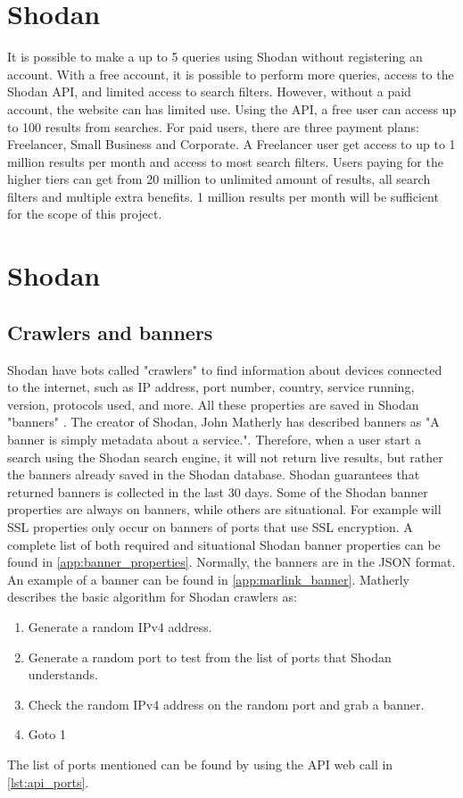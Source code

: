\section{Shodan}\label{sec:shodan}
It is possible to make a up to 5 queries using Shodan without registering an account. 
With a free account, it is possible to perform more queries, access to the Shodan API, and limited access to search filters. However, without a paid account, the website can has limited use.
Using the API, a free user can access up to 100 results from searches. 
For paid users, there are three payment plans: Freelancer, Small Business and Corporate. A Freelancer user get access to up to 1 million results per month and access to most search filters. 
Users paying for the higher tiers can get from 20 million to unlimited amount of results, all search filters and multiple extra benefits. 
1 million results per month will be sufficient for the scope of this project.

\section{Shodan}
\subsection{Crawlers and banners}
Shodan have bots called "crawlers" to find information about devices connected to the internet, such as IP address, port number, country, service running, version, protocols used, and more. 
All these properties are saved in Shodan "banners" . The creator of Shodan, John Matherly has described banners as "A banner is simply metadata about a service.". \cite{banner} 
Therefore, when a user start a search using the Shodan search engine, it will not return live results, but rather the banners already saved in the Shodan database. Shodan guarantees that returned banners is collected in the last 30 days.\cite{matherly_guide_to_shodan}
Some of the Shodan banner properties are always on banners, while others are situational. For example will SSL properties only occur on banners of ports that use SSL encryption. A complete list of both required and situational Shodan banner properties can be found in \cref{app:banner_properties}.
Normally, the banners are in the JSON format. An example of a banner can be found in \cref{app:marlink_banner}.
Matherly\cite{matherly_guide_to_shodan} describes the basic algorithm for Shodan crawlers as:
\begin{enumerate}
\setlength\itemsep{0em}
	\item Generate a random IPv4 address. 
	\item Generate a random port to test from the list of ports that Shodan understands.
	\item Check the random IPv4 address on the random port and grab a banner.
	\item Goto 1
\end{enumerate}
The list of ports mentioned can be found by using the API web call in \cref{lst:api_ports}.


